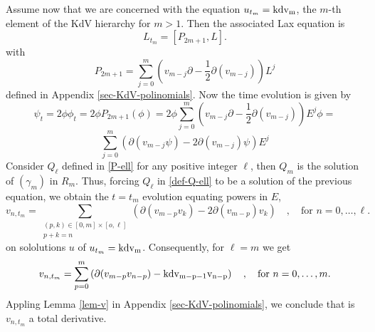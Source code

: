 \documentclass[a4paper,12pt]{article}
\def\kdv{\rm kdv}
\begin{document}
Assume now that we are concerned with the equation $u_{t_m } = \kdv_m$, the $m$-th element of the KdV hierarchy for $m>1$. Then the associated Lax equation is
{\begin{equation}\label{eq:Lax-kdv-l+1}
   L_{t_m } = [ P_{2m+1}  , L].
\end{equation}}
with 
\begin{equation}%
P_{2m+1}=\sum_{j=0}^m \left(v_{m-j}\partial-\frac{1}{2}\partial(v_{m-j})\right)L^j 
\end{equation}
defined in Appendix \ref{sec-KdV-polinomials}. Now the time evolution is given by
\[
\psi_t =2\phi \phi_t = 2\phi P_{2m+1}(\phi)= 2\phi\sum_{j=0}^m \left(v_{m-j}\partial-\frac{1}{2}\partial(v_{m-j})\right)E^j \phi   =
\]
\[
\sum_{j=0}^m \left( 
   \partial(v_{m-j}\psi)-2\partial (v_{m-j})\psi 
   \right)
   E^j
\]
Consider $Q_\ell$ defined in \eqref{P-ell} for any positive integer  $\ell$, then $Q_m$ is the solution of $(\gamma_m )$ in $R_m$. Thus, forcing $Q_\ell$ in \eqref{def-Q-ell} to be a solution of the previous equation,  we obtain the $t=t_m$ evolution equating powers in $E$,
\[
 v_{n,t_m }= \sum_{\substack{(p,k)\in [0,m]\times [o,\ell ] \\ p+k=n}}
 \left(
 \partial (v_{m-p}v_k )-2\partial (v_{m-p})v_k 
 \right)
  \quad , \quad \textrm{for } n=0, \dots ,\ell .   
\]
on sololutions $u$ of $u_{t_m } = \kdv_m$. Consequently, for $\ell=m$ we get
\[
v_{n,t_m }=\sum_{p=0}^m  \left(
 \partial (v_{m-p}v_{n-p} )-\kdv_{m-p-1} v_{n-p} 
 \right)
  \quad , \quad \textrm{for } n=0, \dots ,m .   
\]
Appling Lemma \ref{lem-v}  in Appendix \ref{sec-KdV-polinomials}, we conclude that is $v_{n,t_m }$ a total derivative.
\end{document}
